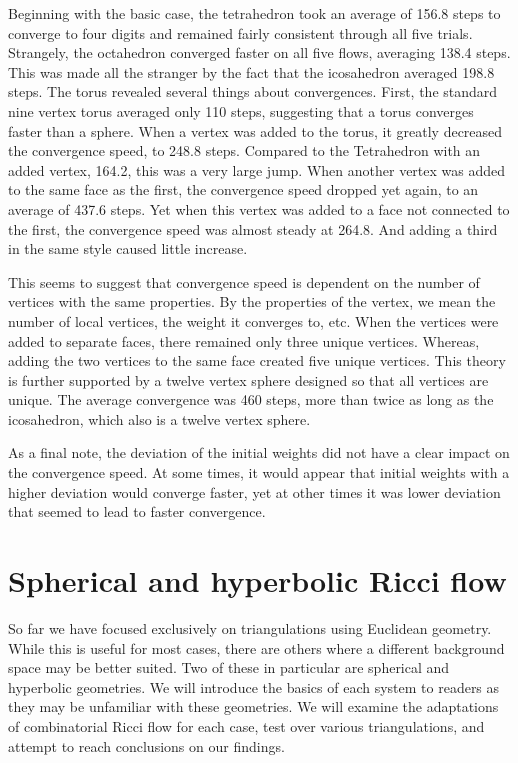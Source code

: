\documentclass[12pt]{article}
\begin{document}
\noindent Beginning with the basic case, the tetrahedron took an average of 156.8 steps to converge to four digits and remained fairly consistent through all five trials. Strangely, the octahedron converged faster on all five flows, averaging 138.4 steps. This was made all the stranger by the fact that the icosahedron averaged 198.8 steps. The torus revealed several things about convergences. First, the standard nine vertex torus averaged only 110 steps, suggesting that a torus converges faster than a sphere. When a vertex was added to the torus, it greatly decreased the convergence speed, to 248.8 steps. Compared to the Tetrahedron with an added vertex, 164.2, this was a very large jump. When another vertex was added to the same face as the first, the convergence speed dropped yet again, to an average of 437.6 steps. Yet when this vertex was added to a face not connected to the first, the convergence speed was almost steady at 264.8. And adding a third in the same style caused little increase.\newline

\noindent This seems to suggest that convergence speed is dependent on the number of vertices with the same properties. By the properties of the vertex, we mean the number of local vertices, the weight it converges to, etc. When the vertices were added to separate faces, there remained only three unique vertices. Whereas, adding the two vertices to the same face created five unique vertices. This theory is further supported by a twelve vertex sphere designed so that all vertices are unique. The average convergence was 460 steps, more than twice as long as the icosahedron, which also is a twelve vertex sphere.\newline

\noindent As a final note, the deviation of the initial weights did not have a clear impact on the convergence speed. At some times, it would appear that initial weights with a higher deviation would converge faster, yet at other times it was lower deviation that seemed to lead to faster convergence.

\section{Spherical and hyperbolic Ricci flow}
\label{HypSphere}

So far we have focused exclusively on triangulations using Euclidean geometry. While this is useful for most cases, there are others where a different background space may be better suited. Two of these in particular are spherical and hyperbolic geometries. We will introduce the basics of each system to readers as they may be unfamiliar with these geometries. We will examine the adaptations of combinatorial Ricci flow for each case, test over various triangulations, and attempt to reach conclusions on our findings. 
\end{document}
